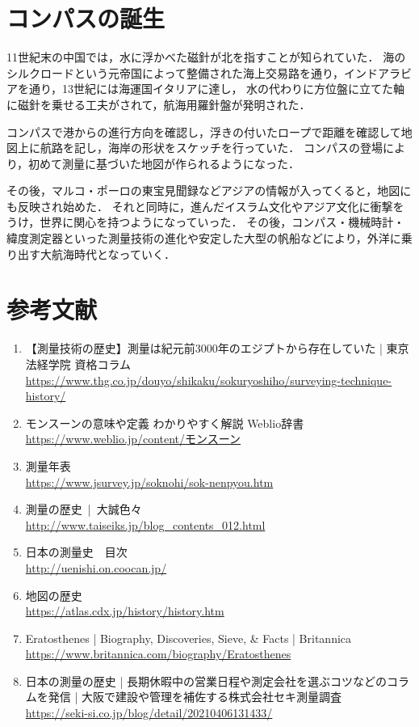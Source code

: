 \documentclass[titlepage,a4paper]{jsarticle}
\begin{document}
\section{コンパスの誕生}
11世紀末の中国では，水に浮かべた磁針が北を指すことが知られていた．
海のシルクロードという元帝国によって整備された海上交易路を通り，インドアラビアを通り，13世紀には海運国イタリアに達し，
水の代わりに方位盤に立てた軸に磁針を乗せる工夫がされて，航海用羅針盤が発明された．

コンパスで港からの進行方向を確認し，浮きの付いたロープで距離を確認して地図上に航路を記し，海岸の形状をスケッチを行っていた．
コンパスの登場により，初めて測量に基づいた地図が作られるようになった．

その後，マルコ・ポーロの東宝見聞録などアジアの情報が入ってくると，地図にも反映され始めた．
それと同時に，進んだイスラム文化やアジア文化に衝撃をうけ，世界に関心を持つようになっていった．
その後，コンパス・機械時計・緯度測定器といった測量技術の進化や安定した大型の帆船などにより，外洋に乗り出す大航海時代となっていく．
\section*{参考文献}
\begin{enumerate}
      \item 【測量技術の歴史】測量は紀元前3000年のエジプトから存在していた | 東京法経学院 資格コラム\\
            \url{https://www.thg.co.jp/douyo/shikaku/sokuryoshiho/surveying-technique-history/}
      \item モンスーンの意味や定義 わかりやすく解説 Weblio辞書\\
            \url{https://www.weblio.jp/content/モンスーン}
      \item 測量年表\\
            \url{https://www.jsurvey.jp/soknohi/sok-nenpyou.htm}
      \item 測量の歴史 | 大誠色々\\
            \url{http://www.taiseiks.jp/blog_contents_012.html}
      \item 日本の測量史　目次\\
            \url{http://uenishi.on.coocan.jp/}
      \item 地図の歴史\\
            \url{https://atlas.cdx.jp/history/history.htm}
      \item Eratosthenes | Biography, Discoveries, Sieve, \& Facts | Britannica\\
            \url{https://www.britannica.com/biography/Eratosthenes}
      \item 日本の測量の歴史 | 長期休暇中の営業日程や測定会社を選ぶコツなどのコラムを発信 | 大阪で建設や管理を補佐する株式会社セキ測量調査\\
            \url{https://seki-si.co.jp/blog/detail/20210406131433/}
\end{enumerate}
% 
\end{document}
